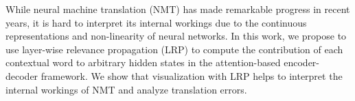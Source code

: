 While neural machine translation (NMT) has made remarkable progress in recent years, it is hard to interpret its internal workings due to the continuous representations and non-linearity of neural networks. In this work, we propose to use layer-wise relevance propagation (LRP) to compute the contribution of each contextual word to arbitrary hidden states in the attention-based encoder-decoder framework. We show that visualization with LRP helps to interpret the internal workings of NMT and analyze translation errors.
